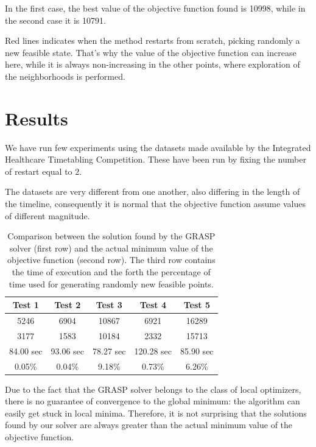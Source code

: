 \documentclass{article}
\begin{document}
In the first case, the best value of the objective function found is 10998, while in the second case it is 10791.

Red lines indicates when the method restarts from scratch, picking randomly a new feasible state. That's why the 
value of the objective function can increase here, while it is always non-increasing in the other points, where exploration of the 
neighborhoods is performed.

\section{Results}
We have run few experiments using the datasets made available by the Integrated Healthcare Timetabling Competition. 
These have been run by fixing the number of restart equal to $2$.

The datasets are very different from one another, also differing in the length of the timeline, consequently it is normal that the objective function assume values of different magnitude.

\begin{table}[h!]
    \centering
    \begin{tabular}{|c|c|c|c|c|}
        \hline
        \textbf{Test 1} & \textbf{Test 2} & \textbf{Test 3} & \textbf{Test 4} & \textbf{Test 5}  \\ \hline
        5246 & 6904 & 10867 & 6921 & 16289   \\ \hline
        3177 & 1583 & 10184 & 2332 & 15713  \\ \hline
        84.00 sec & 93.06 sec & 78.27 sec & 120.28 sec & 85.90 sec \\ \hline
        0.05\% & 0.04\% & 9.18\% & 0.73\% & 6.26\% \\ \hline
    \end{tabular}
    \caption{Comparison between the solution found by the GRASP solver (first row) and the actual minimum value of the objective function (second row). The third row contains the time of execution and the forth the percentage of time used for generating randomly new feasible points.}
    \label{table:risultati}
\end{table}

Due to the fact that the GRASP solver belongs to the class of local optimizers, there is no guarantee of convergence to the global minimum: the algorithm can easily get stuck in local minima. Therefore, it is not surprising that the solutions found by our solver are always greater than the actual minimum value of the objective function.
\end{document}
